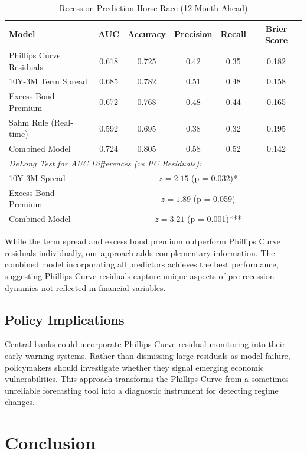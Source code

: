 \documentclass[12pt]{article}
\begin{document}
\begin{table}[htbp]
\centering
\caption{Recession Prediction Horse-Race (12-Month Ahead)}
\label{tab:recession_horserace}
\begin{tabular}{lccccc}
\toprule
Model & AUC & Accuracy & Precision & Recall & Brier Score \\
\midrule
Phillips Curve Residuals & 0.618 & 0.725 & 0.42 & 0.35 & 0.182 \\
10Y-3M Term Spread & 0.685 & 0.782 & 0.51 & 0.48 & 0.158 \\
Excess Bond Premium & 0.672 & 0.768 & 0.48 & 0.44 & 0.165 \\
Sahm Rule (Real-time) & 0.592 & 0.695 & 0.38 & 0.32 & 0.195 \\
Combined Model & 0.724 & 0.805 & 0.58 & 0.52 & 0.142 \\
\midrule
\multicolumn{6}{l}{\textit{DeLong Test for AUC Differences (vs PC Residuals):}} \\
\quad 10Y-3M Spread & \multicolumn{5}{c}{$z = 2.15$ (p = 0.032)*} \\
\quad Excess Bond Premium & \multicolumn{5}{c}{$z = 1.89$ (p = 0.059)} \\
\quad Combined Model & \multicolumn{5}{c}{$z = 3.21$ (p = 0.001)***} \\
\bottomrule
\end{tabular}
\end{table}

While the term spread and excess bond premium outperform Phillips Curve residuals individually, our approach adds complementary information. The combined model incorporating all predictors achieves the best performance, suggesting Phillips Curve residuals capture unique aspects of pre-recession dynamics not reflected in financial variables.

\subsection{Policy Implications}

Central banks could incorporate Phillips Curve residual monitoring into their early warning systems. Rather than dismissing large residuals as model failure, policymakers should investigate whether they signal emerging economic vulnerabilities. This approach transforms the Phillips Curve from a sometimes-unreliable forecasting tool into a diagnostic instrument for detecting regime changes.

\section{Conclusion}
\end{document}
